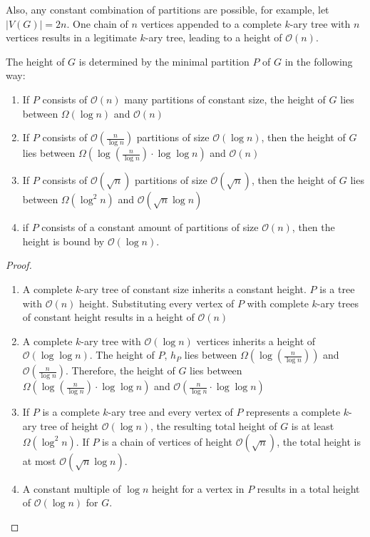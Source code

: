 Also, any constant combination of partitions are possible, for example, let $|V(G)| = 2n$. One chain of $n$ vertices appended to a complete $k$-ary tree with $n$ vertices results in a legitimate $k$-ary tree, leading to a height of $\mathcal{O}(n)$. 
\begin{lemma}
	The height of $G$ is determined by the minimal partition $P$ of $G$ in the following way:
	\begin{enumerate}
		\item If $P$ consists of $\mathcal{O}(n)$ many partitions of constant size, the height of $G$ lies between $\Omega(\log n)$ and $\mathcal{O}(n)$
		\item If $P$ consists of $\mathcal{O}\left(\frac{n}{\log n}\right)$ partitions of size $\mathcal{O}(\log n)$, then the height of $G$ lies between $\Omega\left(\log\left(\frac{n}{\log n}\right)\cdot \log \log n \right)$ and $\mathcal{O}\left( n\right)$
		\item If $P$ consists of $\mathcal{O}(\sqrt{n})$ partitions of size $\mathcal{O}(\sqrt{n})$, then the height of $G$ lies between $\Omega(\log^2 n)$ and $\mathcal{O}(\sqrt{n}\log n)$
		\item if $P$ consists of a constant amount of partitions of size $\mathcal{O}(n)$, then the height is bound by $\mathcal{O}(\log n)$.
	\end{enumerate}
\end{lemma}
\begin{proof}
	\begin{enumerate}
		\item A complete $k$-ary tree of constant size inherits a constant height. $P$ is a tree with $\mathcal{O}(n)$ height. Substituting every vertex of $P$ with complete $k$-ary trees of constant height results in a height of $\mathcal{O}(n)$
		\item A complete $k$-ary tree with $\mathcal{O}(\log n)$ vertices inherits a height of $\mathcal{O}(\log \log n)$. The height of $P$, $h_P$ lies between $\Omega\left(\log\left(\frac{n}{\log n}\right)\right)$ and $\mathcal{O}\left(\frac{n}{\log n}\right)$. Therefore, the height of $G$ lies between $\Omega\left(\log\left(\frac{n}{\log n}\right)\cdot \log \log n \right)$ and $\mathcal{O}\left(\frac{n}{\log n}\cdot \log \log n\right)$
		\item If $P$ is a complete $k$-ary tree and every vertex of $P$ represents a complete $k$-ary tree of height $\mathcal{O}(\log n)$, the resulting total height of $G$ is at least $\Omega(\log^2 n)$. If $P$ is a chain of vertices of height $\mathcal{O}(\sqrt{n})$, the total height is at most $\mathcal{O}(\sqrt{n} \log n)$. 
		\item A constant multiple of $\log n$ height for a vertex in $P$ results in a total height of $\mathcal{O}(\log n)$ for $G$.
	\end{enumerate}
\end{proof}
  
